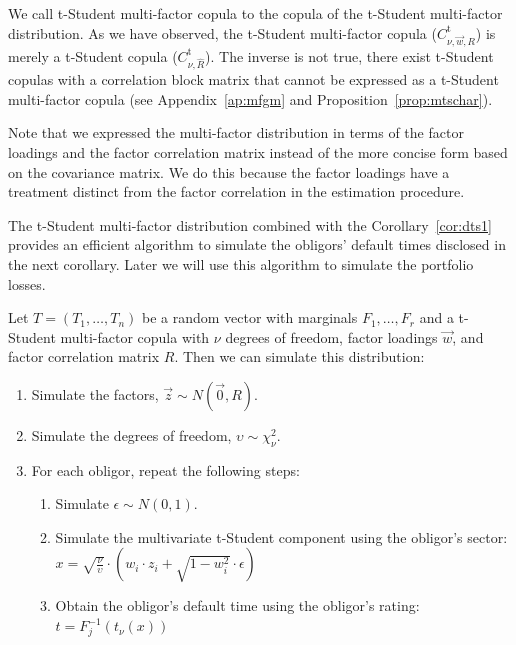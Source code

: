 \documentclass[11pt,fleqn]{book} %
\begin{document}
We call t-Student multi-factor copula to the copula of the t-Student 
multi-factor distribution. As we have observed, the t-Student multi-factor 
copula ($C_{\nu,\vec{w},R}^{\text{t}}$) is merely a t-Student copula 
($C_{\nu,\widehat{R}}^{\text{t}}$). The inverse is not true, there exist
t-Student copulas with a correlation block matrix that cannot be expressed 
as a t-Student multi-factor copula (see Appendix~\ref{ap:mfgm} and 
Proposition~\ref{prop:mtschar}).

Note that we expressed the multi-factor distribution in terms of the factor 
loadings and the factor correlation matrix instead of the more concise form 
based on the covariance matrix. We do this because the factor loadings have 
a treatment distinct from the factor correlation in the estimation procedure.

The t-Student multi-factor distribution combined with the Corollary~\ref{cor:dts1} 
provides an efficient algorithm to simulate the obligors' default times 
disclosed in the next corollary. Later we will use this algorithm to simulate
the portfolio losses.

\begin{corollary}
	\label{cor:dts2}
	Let $T=(T_1, \dots, T_n)$ be a random vector with marginals 
	$F_1, \dots, F_r$ and a t-Student multi-factor copula with 
	$\nu$ degrees of freedom, factor loadings $\vec{w}$, and factor correlation 
	matrix $R$. Then we can simulate this distribution:
	\begin{enumerate}
		\item Simulate the factors, $\vec{z} \sim N(\vec{0},R)$.
		\item Simulate the degrees of freedom, $\upsilon \sim \chi_{\nu}^2$.
		\item For each obligor, repeat the following steps:
		\begin{enumerate}
			\item Simulate $\epsilon \sim N(0,1)$.
			\item Simulate the multivariate t-Student component using the obligor's sector:\\
			$
				x = \sqrt{\frac{\nu}{\upsilon}} \cdot \left( w_i \cdot z_i + \sqrt{1-w_i^2} \cdot \epsilon \right)
			$
			\item Obtain the obligor's default time using the obligor's rating:\\
			$
				t = F_j^{-1}\left(t_{\nu}(x)\right)
			$
		\end{enumerate}
	\end{enumerate}
\end{corollary}
\end{document}
